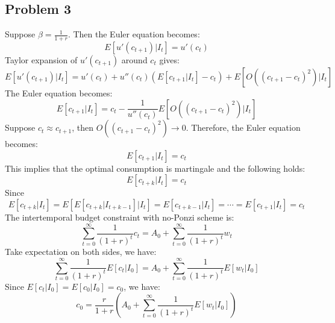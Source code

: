 \documentclass{article}
\begin{document}
\subsection{Problem 3}
Suppose \(\beta = \frac{1}{1+r}\). Then the Euler equation becomes:
\begin{equation}
    E\left[u'(c_{t+1}) | I_t\right] = u'(c_t)
\end{equation}
Taylor expansion of \(u'(c_{t+1})\) around \(c_t\) gives:
\begin{equation}
    E\left[u'(c_{t+1}) | I_t\right] = u'(c_t) + u''(c_t)(E\left[c_{t+1} | I_t\right] - c_t) + E\left[O( (c_{t+1}-c_t)^2 )| I_t\right]
\end{equation}
The Euler equation becomes:
\begin{equation}
    E\left[c_{t+1} | I_t\right]  = c_t - \frac{1}{u''(c_t)}E\left[O( (c_{t+1}-c_t)^2 )| I_t\right]
\end{equation}
Suppose \(c_t \approx c_{t+1}\), then \(O( (c_{t+1}-c_t)^2 ) \rightarrow 0\). Therefore, the Euler equation becomes:
\begin{equation}
    E\left[c_{t+1} | I_t\right]  = c_t
\end{equation}
This implies that the optimal consumption is martingale and the following holds:
\begin{equation}
    E\left[c_{t+k} | I_t\right]  = c_t
\end{equation}
Since
\begin{equation}
    E\left[c_{t+k} | I_t\right] = E\left[E\left[c_{t+k} | I_{t+k-1}\right] | I_t\right] = E\left[c_{t+k-1} | I_t\right] = \cdots = E\left[c_{t+1} | I_t\right] = c_t
\end{equation}
The intertemporal budget constraint with no-Ponzi scheme is:
\begin{equation}
    \sum_{t=0}^{\infty} \frac{1}{(1+r)^t} c_t = A_0 + \sum_{t=0}^{\infty} \frac{1}{(1+r)^t} w_t
\end{equation}
Take expectation on both sides, we have:
\begin{equation}
    \sum_{t=0}^{\infty} \frac{1}{(1+r)^t} E\left[c_t | I_0\right] = A_0 + \sum_{t=0}^{\infty} \frac{1}{(1+r)^t} E\left[w_t | I_0\right]
\end{equation}
Since \(E[c_t|I_0] = E[c_0|I_0] = c_0\), we have:
\begin{equation}
    c_0 = \frac{r}{1+r}\left( A_0 + \sum_{t=0}^{\infty} \frac{1}{(1+r)^t} E\left[w_t|I_0\right] \right)
\end{equation}
\end{document}
